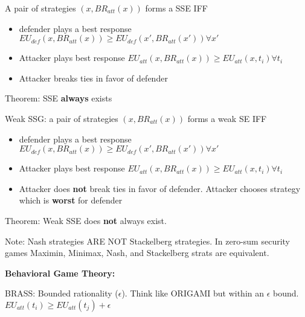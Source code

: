 \documentclass[10pt,letter]{article}
\begin{document}
\begin{multicols}{2}
A pair of strategies $(x,BR_{att}(x))$ forms a SSE IFF
\begin{itemize}
    \item defender plays a best response $EU_{def}(x,BR_{att}(x)) \geq EU_{def}(x',BR_{att}(x'))\forall x'$
    \item Attacker plays best response $EU_{att}(x,BR_{att}(x)) \geq EU_{att}(x,t_i) \forall t_i$
    \item Attacker breaks ties in favor of defender
\end{itemize}
Theorem: SSE \textbf{always} exists

Weak SSG: a pair of strategies $(x,BR_{att}(x))$ forms a weak SE IFF
\begin{itemize}
    \item defender plays a best response $EU_{def}(x,BR_{att}(x)) \geq EU_{def}(x',BR_{att}(x'))\forall x'$
    \item Attacker plays best response $EU_{att}(x,BR_{att}(x)) \geq EU_{att}(x,t_i) \forall t_i$
    \item Attacker does \textbf{not} break ties in favor of defender. Attacker chooses 
        strategy which is \textbf{worst} for defender
\end{itemize}
    Theorem: Weak SSE does \textbf{not} always exist.

Note: Nash strategies ARE NOT Stackelberg strategies. In zero-sum security games
Maximin, Minimax, Nash, and Stackelberg strats are equivalent.

\textbf{Behavioral Game Theory:}

BRASS: Bounded rationality ($\epsilon$). Think like ORIGAMI but within an
$\epsilon$ bound. $EU_{att}(t_i) \geq EU_{att}(t_j) + \epsilon$


\end{multicols}
\end{document}
